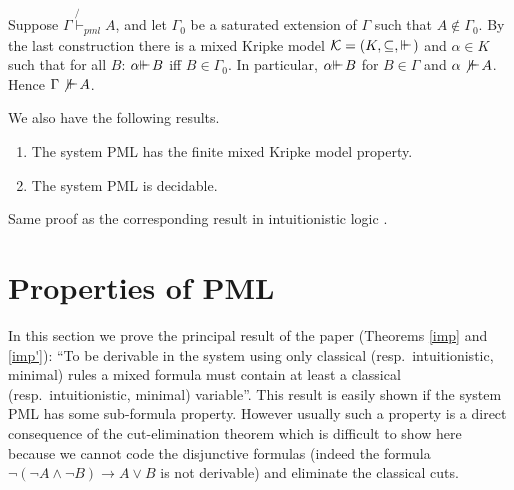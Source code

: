 \documentclass{jancl}
\begin{document}
\begin{proof*}
Suppose ${\Gamma} \not {\vdash}_{pml}  A$, and let ${\Gamma}_0$ be a saturated
extension of ${\Gamma}$ such that $A \not \in {\Gamma}_0$.  By  the last
construction there is a  mixed Kripke model ${\cal K} = (K ,
{\subseteq} , {\ifmmode{ {\vdash}\mkern-7.6mu
{\vdash}\mkern2mu}\else{ {\vdash}\kern-.28em
{\vdash}\hskip1pt\ }\fi\relax})$ and ${\alpha} \in K$ such that for all $B$: ${\alpha}
{\ifmmode{ {\vdash}\mkern-7.6mu
{\vdash}\mkern2mu}\else{ {\vdash}\kern-.28em
{\vdash}\hskip1pt\ }\fi\relax} B$ iff $B \in {\Gamma}_0$. In particular, ${\alpha} {\ifmmode{ {\vdash}\mkern-7.6mu
{\vdash}\mkern2mu}\else{ {\vdash}\kern-.28em
{\vdash}\hskip1pt\ }\fi\relax} B$ for
$B \in {\Gamma}$ and ${\alpha} \not {\ifmmode{ {\vdash}\mkern-7.6mu
{\vdash}\mkern2mu}\else{ {\vdash}\kern-.28em
{\vdash}\hskip1pt\ }\fi\relax} A$. Hence ${\Gamma} \not {\ifmmode{ {\vdash}\mkern-7.6mu
{\vdash}\mkern2mu}\else{ {\vdash}\kern-.28em
{\vdash}\hskip1pt\ }\fi\relax} A$.
\end{proof*}

We also have the following results.
\begin{theorem}
\begin{enumerate}
\item The system {\rm PML} has the finite  mixed Kripke model
property.

\item The system {\rm PML} is decidable.
\end{enumerate}
\end{theorem}

\begin{proof*}
Same proof as the corresponding result in intuitionistic logic
\cite{DNR:2001,DAL:1994}.
\end{proof*}

\section{Properties of PML}

In this section we prove the principal result of the paper
(Theorems \ref{imp} and \ref{imp'}): ``To be derivable in the
system using only classical (resp.\ intuitionistic, minimal) rules
a mixed formula must contain at least a classical (resp.\
intuitionistic, minimal) variable''. This result is easily shown
if the system PML has some sub-formula property. However usually
such a property is a direct consequence of the cut-elimination
theorem which is difficult to show here because we cannot code the
disjunctive formulas (indeed the formula $\neg (\neg A {\wedge} \neg B)
{\rightarrow} A {\vee} B$ is not derivable) and eliminate the classical cuts.
\end{document}
